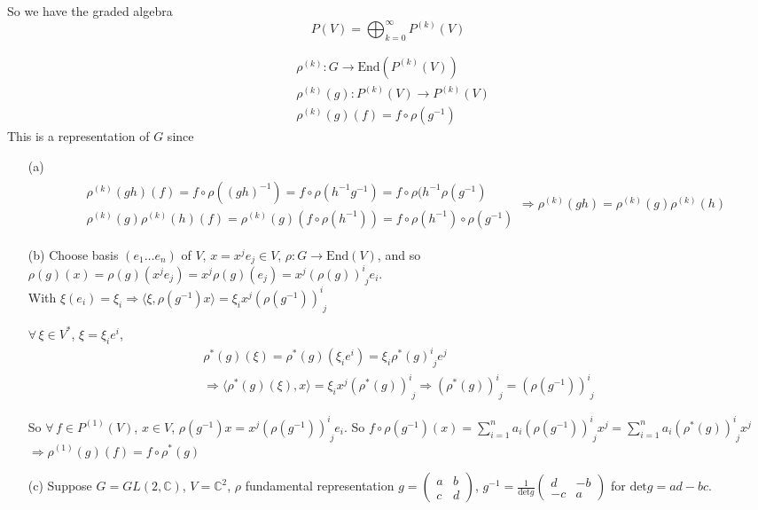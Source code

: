 So we have the graded algebra
\[
P(V) = \bigoplus_{k=0}^{\infty} P^{(k)}(V)
\]

\[
\begin{aligned}
& \rho^{(k)}: G \to \text{End}(P^{(k)}(V)) \\ 
& \rho^{(k)}(g): P^{(k)}(V) \to P^{(k)}(V) \\ 
& \rho^{(k)}(g)(f) = f\circ \rho(g^{-1})
\end{aligned}
\]
This is a representation of $G$ since 
\begin{enumerate}
	\item[(a)] 
	\[
	\begin{gathered}
	\begin{aligned}
	& \rho^{(k)}(gh)(f) = f\circ \rho((gh)^{-1}) = f\circ \rho(h^{-1}g^{-1}) = f\circ \rho(h^{-1}\rho(g^{-1}) \\ 
	& \rho^{(k)}(g) \rho^{(k)}(h)(f) = \rho^{(k)}(g) (f\circ \rho(h^{-1})) = f\circ \rho(h^{-1})\circ \rho(g^{-1})
	\end{aligned} \Longrightarrow \rho^{(k)}(gh) = \rho^{(k)}(g) \rho^{(k)}(h)
	\end{gathered}
	\]
	
	
	\item[(b)]
	Choose basis $(e_1 \dots e_n)$ of $V$, $x = x^j e_j \in V$, $\rho : G \to \text{End}(V)$, and so $\rho(g)(x) = \rho(g)(x^je_j) = x^j\rho(g)(e_j)= x^j(\rho(g))^i_{ \,\, j} e_i$.  \\
	With $\xi(e_i) = \xi_i \Longrightarrow \langle \xi, \rho(g^{-1})x\rangle = \xi_i x^j (\rho(g^{-1}))^i_{ \,\, j}$
	
	$\forall \, \xi \in V^*$, $\xi = \xi_i e^i$, 
	\[
	\begin{gathered}
	\rho^*(g)(\xi) = \rho^*(g)(\xi_i e^i) = \xi_i \rho^*(g)^i_{\,\,j} e^j \\ 
	\Longrightarrow   \langle \rho^*(g)(\xi), x \rangle = \xi_i x^j (\rho^*(g))^i_{ \,\,j} \Longrightarrow (\rho^*(g))^i_{\,\,j} = (\rho(g^{-1}))^i_{ \,\, j} 
	\end{gathered}
	\]
	
	So $\forall \, f \in P^{(1)}(V)$, $x\in V$, $\rho(g^{-1})x = x^j(\rho(g^{-1}))^i_{\,\,j} e_i$.  So $f\circ \rho(g^{-1})(x) = \sum_{i=1}^n a_i(\rho(g^{-1}))^i_{\,\,j} x^j = \sum_{i=1}^n a_i(\rho^*(g))^i_{\,\,j} x^j$ \\
	$\Longrightarrow \rho^{(1)}(g)(f) = f\circ \rho^*(g)$
	\item[(c)] Suppose $G= GL(2,\mathbb{C})$, $V=\mathbb{C}^2$, $\rho$ fundamental representation $g= \left( \begin{matrix} a & b \\
	c & d \end{matrix} \right)$, $g^{-1} = \frac{1}{\text{det}g} \left( \begin{matrix} d & -b \\
	-c & a \end{matrix} \right)$ for $\text{det}g = ad-bc$.  
	

\end{enumerate}
